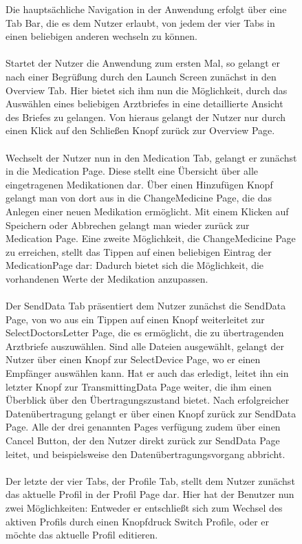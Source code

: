 \documentclass[a4paper]{scrreprt}
\begin{document}
\begin{figure}
Die hauptsächliche Navigation in der Anwendung erfolgt über eine Tab Bar, die es dem Nutzer erlaubt, von jedem der vier Tabs in einen beliebigen anderen wechseln zu können. 
\\
\\
Startet der Nutzer die Anwendung zum ersten Mal, so gelangt er nach einer Begrüßung durch den Launch Screen zunächst in den Overview Tab.
Hier bietet sich ihm nun die Möglichkeit, durch das Auswählen eines beliebigen Arztbriefes in eine detaillierte Ansicht des Briefes zu gelangen.
Von hieraus gelangt der Nutzer nur durch einen Klick auf den Schließen Knopf zurück zur Overview Page.
\\
\\
Wechselt der Nutzer nun in den Medication Tab, gelangt er zunächst in die Medication Page. Diese stellt eine Übersicht über alle eingetragenen Medikationen dar. Über einen Hinzufügen Knopf gelangt man von dort aus in die ChangeMedicine Page, die das Anlegen einer neuen Medikation ermöglicht. Mit einem Klicken auf Speichern oder Abbrechen gelangt man wieder zurück zur Medication Page. Eine zweite Möglichkeit, die ChangeMedicine Page zu erreichen, stellt das Tippen auf einen beliebigen Eintrag der MedicationPage dar: Dadurch bietet sich die Möglichkeit, die vorhandenen Werte der Medikation anzupassen.
\\
\\
Der SendData Tab präsentiert dem Nutzer zunächst die SendData Page, von wo aus ein Tippen auf einen Knopf weiterleitet zur SelectDoctorsLetter Page, die es ermöglicht, die zu übertragenden Arztbriefe auszuwählen. Sind alle Dateien ausgewählt, gelangt der Nutzer über einen Knopf zur SelectDevice Page, wo er einen Empfänger auswählen kann. Hat er auch das erledigt, leitet ihn ein letzter Knopf zur TransmittingData Page weiter, die ihm einen Überblick über den Übertragungszustand bietet. Nach erfolgreicher Datenübertragung gelangt er über einen Knopf zurück zur SendData Page.
Alle der drei genannten Pages verfügung zudem über einen Cancel Button, der den Nutzer direkt zurück zur SendData Page leitet, und beispielsweise den Datenübertragungsvorgang abbricht.
\\
\\
Der letzte der vier Tabs, der Profile Tab, stellt dem Nutzer zunächst das aktuelle Profil in der Profil Page dar. Hier hat der Benutzer nun zwei Möglichkeiten: Entweder er entschließt sich zum Wechsel des aktiven Profils durch einen Knopfdruck Switch Profile, oder er möchte das aktuelle Profil editieren. 

\end{figure}
\end{document}
